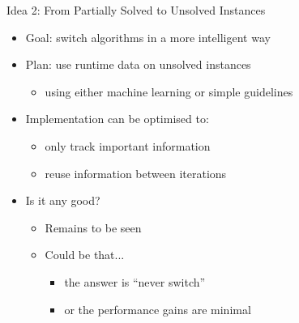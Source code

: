 \documentclass{beamer}
\begin{document}
\begin{frame}{Idea 2: From Partially Solved to Unsolved Instances}
\begin{itemize}
\item Goal: switch algorithms in a more intelligent way
\item Plan: use runtime data on unsolved instances
  \begin{itemize}
  \item using either machine learning or simple guidelines
  \end{itemize}
  \pause
\item Implementation can be optimised to:
  \begin{itemize}
  \item only track important information
  \item reuse information between iterations
  \end{itemize}
  \pause
\item Is it any good?
  \pause
  \begin{itemize}
  \item Remains to be seen
  \item Could be that...
    \pause
    \begin{itemize}
    \item the answer is ``never switch''
    \item or the performance gains are minimal
    \end{itemize}
  \end{itemize}
\end{itemize}
\end{frame}
\end{document}
